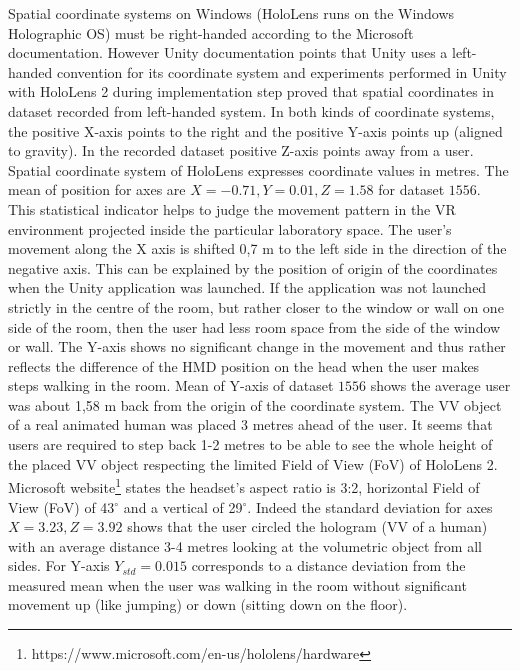 Spatial coordinate systems on Windows (HoloLens runs on the Windows Holographic OS) must be right-handed according to the Microsoft documentation. However Unity documentation points that Unity uses a left-handed convention for its coordinate system and experiments performed in Unity with HoloLens 2 during implementation step proved that spatial coordinates in dataset recorded from left-handed system. In both kinds of coordinate systems, the positive X-axis points to the right and the positive Y-axis points up (aligned to gravity). In the recorded dataset positive Z-axis points away from a user. Spatial coordinate system of HoloLens expresses coordinate values in metres. The mean of position for axes are $X = - 0.71, Y = 0.01, Z = 1.58$ for dataset $1556$. This statistical indicator helps to judge the movement pattern in the VR environment projected inside the particular laboratory space. The user's movement along the X axis is shifted 0,7 m to the left side in the direction of the negative axis. This can be explained by the position of origin of the coordinates when the Unity application was launched. If the application was not launched strictly in the centre of the room, but rather closer to the window or wall on one side of the room, then the user had less room space from the side of the window or wall. The Y-axis shows no significant change in the movement and thus rather reflects the difference of the HMD position on the head when the user makes steps walking in the room. Mean of Y-axis of dataset $1556$ shows the average user was about 1,58 m back from the origin of the coordinate system. The VV object of a real animated human was placed 3 metres ahead of the user. It seems that users are required to step back 1-2 metres to be able to see the whole height of the placed VV object respecting the limited Field of View (FoV) of HoloLens 2. Microsoft website\footnote{https://www.microsoft.com/en-us/hololens/hardware} states the headset’s aspect ratio is 3:2, horizontal Field of View (FoV) of 43$^{\circ}$ and a vertical of 29$^{\circ}$. Indeed the standard deviation for axes $X = 3.23, Z = 3.92$ shows that the user circled the hologram (VV of a human) with an average distance 3-4 metres looking at the volumetric object from all sides. For Y-axis $Y_{std} = 0.015$ corresponds to a distance deviation from the measured mean when the user was walking in the room without significant movement up (like jumping) or down (sitting down on the floor).


